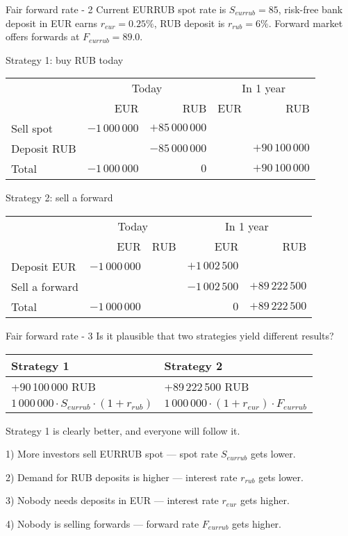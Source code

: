 \documentclass{beamer}
\begin{document}
\begin{frame}{Fair forward rate - 2}
\justify
Current EURRUB spot rate is $S_{eurrub}=85$, risk-free bank deposit in EUR earns $r_{eur}=0.25\%$, RUB deposit is $r_{rub}=6\%$. 
Forward market offers forwards at $F_{eurrub}=89.0$.

\justify
Strategy 1: buy RUB today

\centering
\begin{tabular}{l|r|r|r|r}
& \multicolumn{2}{c|}{Today} & \multicolumn{2}{c}{In 1 year} \\ \cline{2-5}
& EUR & RUB & EUR & RUB \\ \hline
Sell spot & $-1\,000\,000$ & $+85\,000\,000$ & & \\
Deposit RUB & & $-85\,000\,000$ & & $+90\,100\,000$ \\ \hline
Total & $-1\,000\,000$ & $0$ & & $+90\,100\,000$
\end{tabular}

\justify
Strategy 2: sell a forward

\centering
\begin{tabular}{l|r|r|r|r}
& \multicolumn{2}{c|}{Today} & \multicolumn{2}{c}{In 1 year} \\ \cline{2-5}
& EUR & RUB & EUR & RUB \\ \hline
Deposit EUR & $-1\,000\,000$ & & $+1\,002\,500$ & \\
Sell a forward &   &   & $-1\,002\,500$ & $+89\,222\,500$ \\ \hline
Total & $-1\,000\,000$ &   & $0$ & $+89\,222\,500$
\end{tabular}

\end{frame}



\begin{frame}{Fair forward rate - 3}
\justify
Is it plausible that two strategies yield different results?

\justify
\centering
\begin{tabular}{l|l}
Strategy 1 & Strategy 2 \\ \hline
+90\,100\,000 RUB  & +89\,222\,500 RUB \\
$1\,000\,000 \cdot S_{eurrub} \cdot (1+r_{rub})$ & $1\,000\,000 \cdot (1+r_{eur}) \cdot F_{eurrub}$
\end{tabular}

\justify
Strategy 1 is clearly better, and everyone will follow it. 

1) More investors sell EURRUB spot --- spot rate $S_{eurrub}$ gets lower.

2) Demand for RUB deposits is higher --- interest rate $r_{rub}$ gets lower.

3) Nobody needs deposits in EUR --- interest rate $r_{eur}$ gets higher. 

4) Nobody is selling forwards --- forward rate $F_{eurrub}$ gets higher.
\end{frame}
\end{document}
